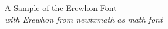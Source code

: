 \documentclass[11pt]{article}
\begin{document}
{\LARGE \noindent A Sample of the Erewhon Font}\\

{\large \noindent \textit{with Erewhon from newtxmath as math font}}\\[5pt]


\end{document}
